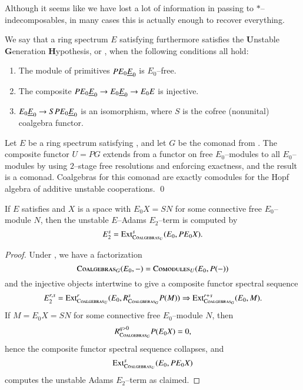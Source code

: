 Although it seems like we have lost a lot of information in passing to $\ast$--indecomposables, in many cases this is actually enough to recover everything.  

\begin{definition}
We say that a ring spectrum $E$ satisfying {\UFH} furthermore satisfies the \textbf{U}nstable \textbf{G}eneration \textbf{H}ypothesis, or , when the following conditions all hold:
\begin{enumerate}
    \item The module of primitives $P E_0 \underline{\smash{E}}_{0}$ is $E_0$--free.
    \item The composite $P E_0 \underline{\smash{E}}_{0} \to E_0 \underline{\smash{E}}_{0} \to E_0 E$ is injective.
    \item $E_0 \underline{\smash{E}}_{0} \to SP E_0 \underline{\smash{E}}_{0}$ is an isomorphism, where $S$ is the cofree (nonunital) coalgebra functor.
\end{enumerate}
\end{definition}

\begin{lemma}\label{ShorterUnstableResns}
Let $E$ be a ring spectrum satisfying {\UGH}, and let $G$ be the comonad from .  The composite functor $U = P G$ extends from a functor on free $E_0$--modules to all $E_0$--modules by using $2$--stage free resolutions and enforcing exactness, and the result is a comonad.  Coalgebras for this comonad are exactly comodules for the Hopf algebra of additive unstable cooperations. \qed
\end{lemma}

\begin{corollary}
If $E$ satisfies {\UGH} and $X$ is a space with $E_0 X = SN$ for some connective free $E_0$--module $N$, then the unstable $E$--Adams $E_2$--term is computed by \[E_2^s = \operatorname{Ext}^s_{\normalfont\textsc{Coalgebras}_U}(E_0, P E_0 X).\]
\end{corollary}
\begin{proof}
Under {\UGH}, we have a factorization \[\normalfont\textsc{Coalgebras}_{G}(E_0, -) = \normalfont\textsc{Comodules}_{U}(E_0, P(-))\] and the injective objects intertwine to give a composite functor spectral sequence \[E_2^{r, s} = \operatorname{Ext}^r_{\normalfont\textsc{Coalgebras}_U}(E_0, R^s_{\normalfont\textsc{Coalgberas}_G} P(M)) \Rightarrow \operatorname{Ext}^{r+s}_{\normalfont\textsc{Coalgebras}_G}(E_0, M).\]  If $M = E_0 X = SN$ for some connective free $E_0$--module $N$, then \[R^{q > 0}_{\normalfont\textsc{Coalgebras}_G} P(E_0 X) = 0,\] hence the composite functor spectral sequence collapses, and \[\operatorname{Ext}^s_{\normalfont\textsc{Coalgebras}_U}(E_0, P E_0 X)\] computes the unstable Adams $E_2$--term as claimed.
\end{proof}

